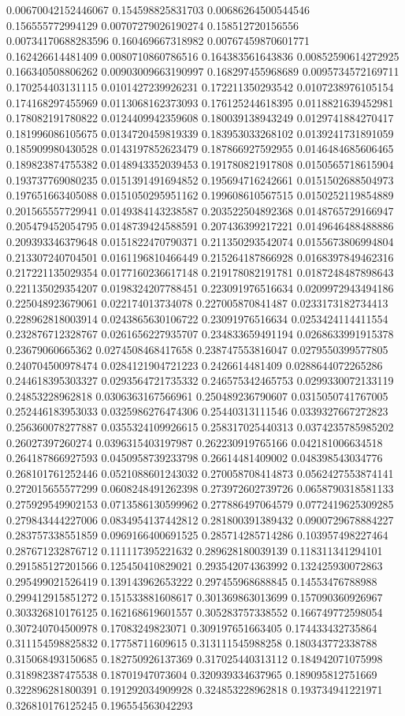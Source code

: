 \begin{table}
\begin{tabu}
\begin{sparkline}{10}
0.00670042152446067 0.154598825831703 0.00686264500544546 0.156555772994129 0.00707279026190274 0.158512720156556 0.00734170688283596 0.160469667318982 0.00767459870601771 0.162426614481409 0.0080710860786516 0.164383561643836 0.00852590614272925 0.166340508806262 0.00903009663190997 0.168297455968689 0.0095734572169711 0.170254403131115 0.0101427239926231 0.172211350293542 0.0107238976105154 0.174168297455969 0.0113068162373093 0.176125244618395 0.0118821639452981 0.178082191780822 0.0124409942359608 0.180039138943249 0.0129741884270417 0.181996086105675 0.0134720459819339 0.183953033268102 0.0139241731891059 0.185909980430528 0.0143197852623479 0.187866927592955 0.0146484685606465 0.189823874755382 0.0148943352039453 0.191780821917808 0.0150565718615904 0.193737769080235 0.0151391491694852 0.195694716242661 0.0151502688504973 0.197651663405088 0.0151050295951162 0.199608610567515 0.0150252119854889 0.201565557729941 0.0149384143238587 0.203522504892368 0.0148765729166947 0.205479452054795 0.0148739424588591 0.207436399217221 0.0149646488488886 0.209393346379648 0.0151822470790371 0.211350293542074 0.0155673806994804 0.213307240704501 0.0161196810466449 0.215264187866928 0.0168397849462316 0.217221135029354 0.0177160236617148 0.219178082191781 0.0187248487898643 0.221135029354207 0.0198324207788451 0.223091976516634 0.0209972943494186 0.225048923679061 0.022174013734078 0.227005870841487 0.0233173182734413 0.228962818003914 0.0243865630106722 0.23091976516634 0.0253424114411554 0.232876712328767 0.0261656227935707 0.234833659491194 0.0268633991915378 0.23679060665362 0.0274508468417658 0.238747553816047 0.0279550399577805 0.240704500978474 0.0284121904721223 0.2426614481409 0.0288644072265286 0.244618395303327 0.0293564721735332 0.246575342465753 0.0299330072133119 0.24853228962818 0.0306363167566961 0.250489236790607 0.0315050741767005 0.252446183953033 0.0325986276474306 0.25440313111546 0.0339327667272823 0.256360078277887 0.0355324109926615 0.258317025440313 0.0374235785985202 0.26027397260274 0.0396315403197987 0.262230919765166 0.042181006634518 0.264187866927593 0.0450958739233798 0.26614481409002 0.048398543034776 0.268101761252446 0.0521088601243032 0.270058708414873 0.0562427553874141 0.272015655577299 0.0608248491262398 0.273972602739726 0.0658790318581133 0.275929549902153 0.0713586130599962 0.277886497064579 0.0772419625309285 0.279843444227006 0.0834954137442812 0.281800391389432 0.0900729678884227 0.283757338551859 0.0969166400691525 0.285714285714286 0.103957498227464 0.287671232876712 0.111117395221632 0.289628180039139 0.118311341294101 0.291585127201566 0.125450410829021 0.293542074363992 0.132425930072863 0.295499021526419 0.139143962653222 0.297455968688845 0.14553476788988 0.299412915851272 0.151533881608617 0.301369863013699 0.157090360926967 0.303326810176125 0.162168619601557 0.305283757338552 0.166749772598054 0.307240704500978 0.17083249823071 0.309197651663405 0.174433432735864 0.311154598825832 0.17758711609615 0.313111545988258 0.180343772338788 0.315068493150685 0.182750926137369 0.317025440313112 0.184942071075998 0.318982387475538 0.18701947073604 0.320939334637965 0.189095812751669 0.322896281800391 0.191292034909928 0.324853228962818 0.193734941221971 0.326810176125245 0.196554563042293 
\end{sparkline}
\end{tabu}
\end{table}
